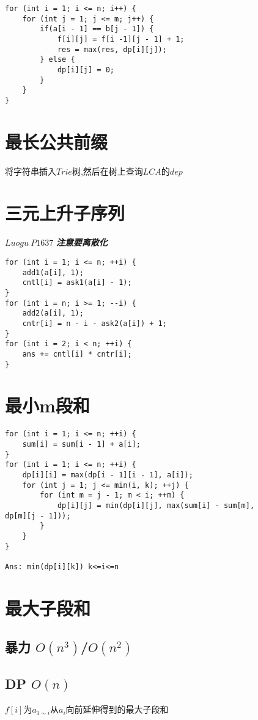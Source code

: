 \documentclass[UTF8]{ctexart}
\begin{document}
\begin{lstlisting}
for (int i = 1; i <= n; i++) {
	for (int j = 1; j <= m; j++) {
		if(a[i - 1] == b[j - 1]) {
			f[i][j] = f[i -1][j - 1] + 1;
			res = max(res, dp[i][j]);
		} else {
			dp[i][j] = 0;
		}
	}
}	
\end{lstlisting}

\section{最长公共前缀}

将字符串插入$Trie$树,然后在树上查询$LCA$的$dep$

\section{三元上升子序列}

$Luogu\ P1637$ \textbf{\emph{注意要离散化}}

\begin{lstlisting}
for (int i = 1; i <= n; ++i) {
	add1(a[i], 1);
	cntl[i] = ask1(a[i] - 1);
}
for (int i = n; i >= 1; --i) {
	add2(a[i], 1);
	cntr[i] = n - i - ask2(a[i]) + 1;
}
for (int i = 2; i < n; ++i) {
	ans += cntl[i] * cntr[i];
}
\end{lstlisting}

\section{最小m段和}

\begin{lstlisting}
for (int i = 1; i <= n; ++i) {
	sum[i] = sum[i - 1] + a[i];
}
for (int i = 1; i <= n; ++i) {
	dp[i][i] = max(dp[i - 1][i - 1], a[i]);
	for (int j = 1; j <= min(i, k); ++j) {
		for (int m = j - 1; m < i; ++m) {
			dp[i][j] = min(dp[i][j], max(sum[i] - sum[m], 
dp[m][j - 1]));
		}
	}
}

Ans: min(dp[i][k]) k<=i<=n
\end{lstlisting}

\section{最大子段和}
\subsection{暴力 $O(n^3)$/$O(n^2)$}
\subsection{DP $O(n)$}
$f[i]$为$a_{1\sim i}$从$a_i$向前延伸得到的最大子段和
\end{document}
